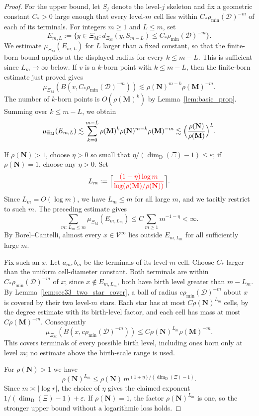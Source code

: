 \documentclass{article}
\DeclareRobustCommand{\revision}[1]{{\color{red}#1}}
\theoremstyle{plain}
\theoremstyle{definition}
\newcommand{\dimdeg}{\dim_\mathrm{D}}
\begin{document}
\begin{proof}
For the upper bound, let $S_j$ denote the level-$j$ skeleton and fix a geometric constant $C_*>0$ large enough that every level-$m$ cell lies within $C_*\rho_{\min}(\mathcal D)^{-m}$ \revision{of each of its terminals.}
For integers $m\ge 1$ and $L\le m$, set
\[
E_{m,L}
:=
\{y\in\Xi_{\mathrm M}: d_{\Xi_{\mathrm M}}(y,S_{m-L})\le C_*\rho_{\min}(\mathcal D)^{-m}\}.
\]
\revision{We estimate $\mu_{\Xi_{\mathrm M}}(E_{m,L})$ for $L$ larger than a fixed constant, so that the finite-born bound applies at the displayed radius for every $k\le m-L$. This is sufficient since $L_m\to\infty$ below.}
If $v$ is a $k$-born point with $k\le m-L$, then the finite-born estimate just proved gives
\[
\mu_{\Xi_{\mathrm M}}(B(v,C_*\rho_{\min}(\mathcal D)^{-m}))
\lesssim
\rho(\mathbf N)^{m-k}\rho(\mathbf M)^{-m}.
\]
The number of $k$-born points is $O(\rho(\mathbf M)^k)$ by Lemma~\ref{lem:basic_prop}.
Summing over $k\le m-L$, we obtain
\[
\mu_{\Xi_{\mathrm M}}(E_{m,L})
\lesssim
\sum_{k=0}^{m-L}
\rho(\mathbf M)^k\rho(\mathbf N)^{m-k}\rho(\mathbf M)^{-m}
\lesssim
\Bigl(\frac{\rho(\mathbf N)}{\rho(\mathbf M)}\Bigr)^L.
\]

\revision{If $\rho(\mathbf N)>1$, choose $\eta>0$ so small that $\eta/(\dimdeg(\Xi)-1)\le\varepsilon$; if $\rho(\mathbf N)=1$, choose any $\eta>0$. Set}
\[
L_m
:=
\Bigl\lceil
\revision{\frac{(1+\eta)\log m}{\log(\rho(\mathbf M)/\rho(\mathbf N))}}
\Bigr\rceil.
\]
Since $L_m=O(\log m)$, we have $L_m\le m$ for all large $m$, and we tacitly restrict to such $m$.
\begingroup\color{red}
The preceding estimate gives
\[
\sum_{m:\,L_m\le m}\mu_{\Xi_{\mathrm M}}(E_{m,L_m})
\le C\sum_{m\ge1}m^{-1-\eta}<\infty.
\]
By Borel--Cantelli, almost every $x\in\mathscr V^\infty$ lies outside
$E_{m,L_m}$ for all sufficiently large $m$.
\endgroup{}

\begingroup\color{red}
Fix such an $x$. Let $a_m,b_m$ be the terminals of its level-$m$ cell.
Choose $C_*$ larger than the uniform cell-diameter constant.
Both terminals are within $C_*\rho_{\min}(\mathcal D)^{-m}$ of $x$;
since $x\notin E_{m,L_m}$, both have birth level greater than $m-L_m$.
By Lemma~\ref{lem:sec33_two_star_cover}, a ball of radius
$c\rho_{\min}(\mathcal D)^{-m}$ about $x$ is covered by their two
level-$m$ stars. Each star has at most $C\rho(\mathbf N)^{L_m}$ cells,
by the degree estimate with its birth-level factor, and each cell has
mass at most $C\rho(\mathbf M)^{-m}$. Consequently
\[
\mu_{\Xi_{\mathrm M}}(B(x,c\rho_{\min}(\mathcal D)^{-m}))
\le C\rho(\mathbf N)^{L_m}\rho(\mathbf M)^{-m}.
\]
This covers terminals of every possible birth level, including ones born
only at level $m$; no estimate above the birth-scale range is used.
\endgroup{}

\begingroup\color{red}
For $\rho(\mathbf N)>1$ we have
\[
\rho(\mathbf N)^{L_m}\le\rho(\mathbf N)\,
m^{(1+\eta)/(\dimdeg(\Xi)-1)}.
\]
Since $m\asymp|\log r|$, the choice of $\eta$ gives the claimed
exponent $1/(\dimdeg(\Xi)-1)+\varepsilon$.
If $\rho(\mathbf N)=1$, the factor $\rho(\mathbf N)^{L_m}$ is one,
so the stronger upper bound without a logarithmic loss holds.
\endgroup{}

\end{proof}
\end{document}
